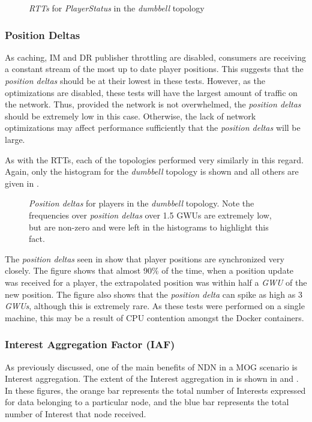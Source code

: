 \begin{figure}[H]
    \centering
    \caption{\textit{RTTs} for \textit{PlayerStatus} in the \textit{dumbbell} topology}
    \label{fig:eval:basic:rtt}
\end{figure}


\subsubsection*{Position Deltas}
As caching, IM and DR publisher throttling are disabled, consumers are receiving a constant stream of the most up to date player positions. This suggests that the \textit{position deltas} should be at their lowest in these tests. However, as the optimizations are disabled, these tests will have the largest amount of traffic on the network. Thus, provided the network is not overwhelmed, the \textit{position deltas} should be extremely low in this case. Otherwise, the lack of network optimizations may affect performance sufficiently that the \textit{position deltas} will be large. 

As with the RTTs, each of the topologies performed very similarly in this regard. Again, only the histogram for the \textit{dumbbell} topology is shown and all others are given in .

\begin{figure}[H]
    \centering
    \caption{\textit{Position deltas} for players in the \textit{dumbbell} topology. Note the frequencies over \textit{position deltas} over 1.5 GWUs are extremely low, but are non-zero and were left in the histograms to highlight this fact.}
    \label{fig:eval:basic:pos-deltas}
\end{figure}

The \textit{position deltas} seen in  show that player positions are synchronized very closely. The figure shows that almost 90\% of the time, when a position update was received for a player, the extrapolated position was within half a \textit{GWU} of the new position. The figure also shows that the \textit{position delta} can spike as high as 3 \textit{GWUs}, although this is extremely rare. As these tests were performed on a single machine, this may be a result of CPU contention amongst the Docker containers.



\subsubsection*{Interest Aggregation Factor (IAF)}
As previously discussed, one of the main benefits of NDN in a MOG scenario is Interest aggregation. The extent of the Interest aggregation in \game{} is shown in  and . In these figures, the orange bar represents the total number of Interests expressed for data belonging to a particular node, and the blue bar represents the total number of Interest that node received. 

